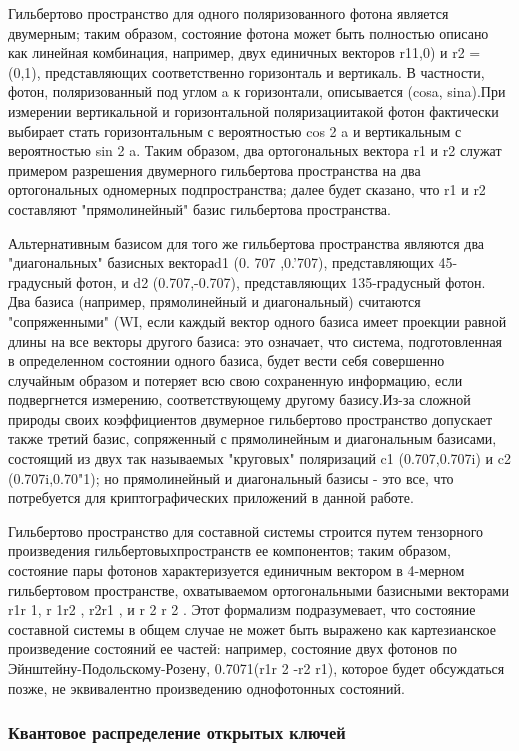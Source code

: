 ­­Гильбертово пространство для одного поляризованного фотона является двумерным; таким образом, состояние фотона может быть полностью описано как линейная комбинация, например, двух единичных векторов r11,0) и r2 = (0,1), представляющих соответственно горизонталь и вертикаль. В частности, фотон, поляризованный под углом a к горизонтали, описывается (cosa, sina).При измерении вертикальной и горизонтальной поляризациитакой фотон фактически выбирает стать горизонтальным с вероятностью cos 2 a и вертикальным с вероятностью sin 2 a. Таким образом, два ортогональных вектора r1 и r2 служат примером разрешения двумерного гильбертова пространства на два ортогональных одномерных подпространства; далее будет сказано, что r1 и r2 составляют "прямолинейный" базис гильбертова пространства.

­­Альтернативным базисом для того же гильбертова пространства являются два "диагональных" базисных вектораd1 (0. 707 ,0.'707), представляющих 45-градусный фотон, и d2 (0.707,-0.707), представляющих 135-градусный фотон. Два базиса (например, прямолинейный и диагональный) считаются "сопряженными" (WI, если каждый вектор одного базиса имеет проекции равной длины на все векторы другого базиса: это означает, что система, подготовленная в определенном состоянии одного базиса, будет вести себя совершенно случайным образом и потеряет всю свою сохраненную информацию, если подвергнется измерению, соответствующему другому базису.Из-за сложной природы своих коэффициентов двумерное гильбертово пространство допускает также третий базис, сопряженный с прямолинейным и диагональным базисами, состоящий из двух так называемых "круговых" поляризаций c1 (0.707,0.707i) и c2 (0.707i,0.70"1); но прямолинейный и диагональный базисы - это все, что потребуется для криптографических приложений в данной работе.

­­Гильбертово пространство для составной системы строится путем тензорного произведения гильбертовыхпространств ее компонентов; таким образом, состояние пары фотонов характеризуется единичным вектором в 4-мерном гильбертовом пространстве, охватываемом ортогональными базисными векторами r1r 1, r 1r2 , r2r1 , и r 2 r 2 . Этот формализм подразумевает, что состояние составной системы в общем случае не может быть выражено как картезианское произведение состояний ее частей: например, состояние двух фотонов по Эйнштейну-Подольскому-Розену, 0.7071(r1r 2 -r2 r1), которое будет обсуждаться позже, не эквивалентно произведению однофотонных состояний.

\subsubsection{Квантовое распределение открытых ключей}

